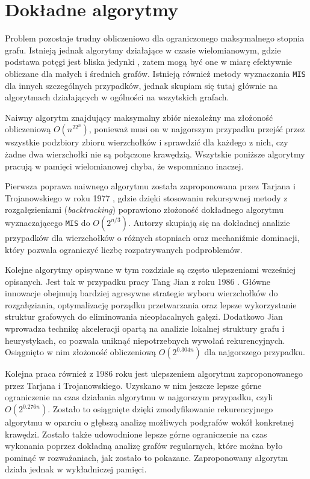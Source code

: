 \documentclass[12pt]{article}
\begin{document}
\section{Dokładne algorytmy}

Problem pozostaje trudny obliczeniowo dla ograniczonego maksymalnego stopnia grafu. Istnieją jednak algorytmy działające w czasie wielomianowym, gdzie podstawa potęgi jest bliska jedynki \cite{xiao2013confining, xiao2016exact, xiao2017refined}, zatem mogą być one w miarę efektywnie obliczane dla małych i średnich grafów. Istnieją również metody wyznaczania \texttt{MIS} dla innych szczególnych przypadków, jednak skupiam się tutaj głównie na algorytmach działających w ogólności na wszytskich grafach.

Naiwny algorytm znajdujący maksymalny zbiór niezależny ma złożoność obliczeniową $O(n^22^n)$, ponieważ musi on w najgorszym przypadku przejść przez wszystkie podzbiory zbioru wierzchołków i sprawdzić dla każdego z nich, czy żadne dwa wierzchołki nie są połączone krawędzią. Wszytskie poniższe algorytmy pracują w pamięci wielomianowej chyba, że wspomniano inaczej.

Pierwsza poprawa naiwnego algorytmu została zaproponowana przez Tarjana i Trojanowskiego w roku 1977 \cite{tarjan1977finding}, gdzie dzięki stosowaniu rekursywnej metody z rozgałęzieniami (\textit{backtracking}) poprawiono złożoność dokładnego algorytmu wyznaczającego \texttt{MIS} do $O(2^{n/3})$. Autorzy skupiają się na dokładnej analizie przypadków dla wierzchołków o różnych stopniach oraz mechaniźmie dominacji, który pozwala ograniczyć liczbę rozpatrywanych podproblemów.

Kolejne algorytmy opisywane w tym rozdziale są często ulepszeniami wcześniej opisanych. Jest tak w przypadku pracy Tang Jian z roku 1986 \cite{jian19862}. Główne innowacje obejmują bardziej agresywne strategie wyboru wierzchołków do rozgałęziania, optymalizację porządku przetwarzania oraz lepsze wykorzystanie struktur grafowych do eliminowania nieopłacalnych gałęzi. Dodatkowo Jian wprowadza technikę akceleracji opartą na analizie lokalnej struktury grafu i heurystykach, co pozwala uniknąć niepotrzebnych wywołań rekurencyjnych. Osiągnięto w nim złożoność obliczeniową $O(2^{0.304n})$ dla najgorszego przypadku.

Kolejna praca również z 1986 roku \cite{robson1986algorithms} jest ulepszeniem algorytmu zaproponowanego przez Tarjana i Trojanowskiego. Uzyskano w nim jeszcze lepsze górne ograniczenie na czas działania algorytmu w najgorszym przypadku, czyli $O(2^{0.276n})$. Zostało to osiągnięte dzięki zmodyfikowanie rekurencyjnego algorytmu w oparciu o głębszą analizę możliwych podgrafów wokół konkretnej krawędzi. Zostało także udowodnione lepsze górne ograniczenie na czas wykonania poprzez dokładną analizę grafów regularnych, które można było pominąć w rozważaniach, jak zostało to pokazane. Zaproponowany algorytm działa jednak w wykładniczej pamięci.
\end{document}
